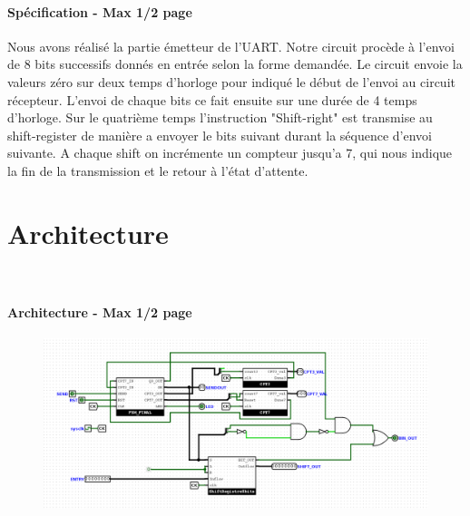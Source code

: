 \documentclass[a4paper]{article} %
\begin{document}


\begin{tcolorbox}[colframe=Monokaimagenta,colback=white]
\paragraph %
{Spécification - Max 1/2 page } 
Nous avons réalisé la partie émetteur de l'UART. Notre circuit procède à l'envoi de 8 bits successifs donnés en entrée selon la forme demandée. Le circuit envoie la valeurs zéro sur deux temps d'horloge pour indiqué le début de l'envoi au circuit récepteur. L'envoi de chaque bits ce fait ensuite sur une durée de 4 temps d'horloge. Sur le quatrième temps l'instruction "Shift-right" est transmise au shift-register de manière a envoyer le bits suivant durant la séquence d'envoi suivante. A chaque shift on incrémente un compteur jusqu'a 7, qui nous indique la fin de la transmission et le retour à l'état d'attente.
\end{tcolorbox}

\section{Architecture}\

\begin{tcolorbox}[colframe=Monokaimagenta,colback=white]
\paragraph{Architecture - Max 1/2 page} 
\begin{figure}[H]
	\centering
	\includegraphics[width=\textwidth]{src/schema_UART}
	\label{fig:UART}
\end{figure}


\end{tcolorbox}
\end{document}
